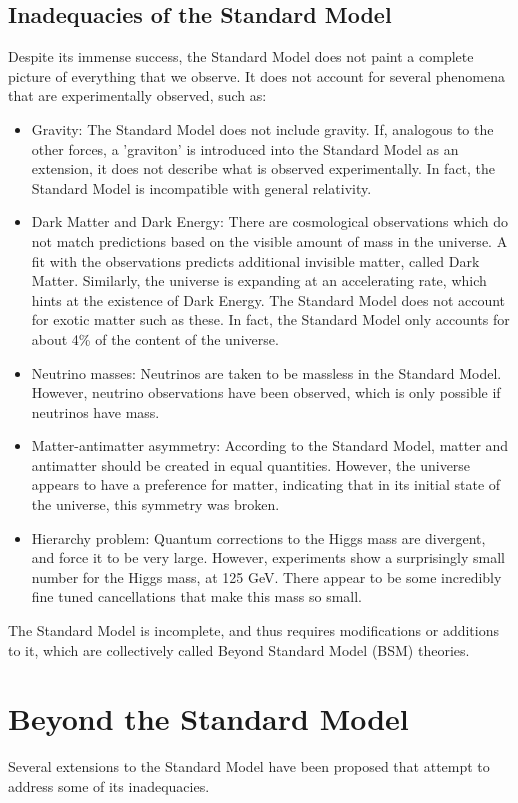 \documentclass[11pt,a4paper]{report}
\begin{document}
\subsection{Inadequacies of the Standard Model}
Despite its immense success, the Standard Model does not paint a complete picture of everything that we observe. It does not account for several phenomena that are experimentally observed, such as:
\begin{itemize}
\item Gravity: The Standard Model does not include gravity. If, analogous to the other forces, a 'graviton' is introduced into the Standard Model as an extension, it does not describe what is observed experimentally. In fact, the Standard Model is incompatible with general relativity.
\item Dark Matter and Dark Energy: There are cosmological observations which do not match predictions based on the visible amount of mass in the universe. A fit with the observations predicts additional invisible matter, called Dark Matter. Similarly, the universe is expanding at an accelerating rate, which hints at the existence of Dark Energy. The Standard Model does not account for exotic matter such as these. In fact, the Standard Model only accounts for about 4\% of the content of the universe.
\item Neutrino masses: Neutrinos are taken to be massless in the Standard Model. However, neutrino observations have been observed, which is only possible if neutrinos have mass.
\item Matter-antimatter asymmetry: According to the Standard Model, matter and antimatter should be created in equal quantities. However, the universe appears to have a preference for matter, indicating that in its initial state of the universe, this symmetry was broken.
\item Hierarchy problem: Quantum corrections to the Higgs mass are divergent, and force it to be very large. However, experiments show a surprisingly small number for the Higgs mass, at 125 GeV. There appear to be some incredibly fine tuned cancellations that make this mass so small.
\end{itemize}

The Standard Model is incomplete, and thus requires modifications or additions to it, which are collectively called Beyond Standard Model (BSM) theories.

\section{Beyond the Standard Model}
Several extensions to the Standard Model have been proposed that attempt to address some of its inadequacies. 
\end{document}
